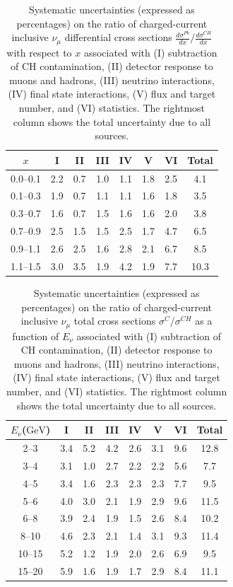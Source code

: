\documentclass[aps,preprint,showpacs,superscriptaddress]{revtex4} %
\newcommand{\numu}{\ensuremath{\nu_{\mu}}\xspace}
\newcommand{\GeV}{\ensuremath{\mbox{GeV}}\xspace}
\newcommand{\Xbj}{\ensuremath{x}\xspace}
\newcommand{\Enu}{\ensuremath{E_{\nu}}\xspace}
\begin{document}
\begingroup
\squeezetable
\begin{table}
  \begin{tabular}{cccccccc}
    \hline \hline
    \Xbj & I & II & III & IV & V & VI & Total \\ 
    \hline
    0.0--0.1 & 2.2 & 0.7 & 1.0 & 1.1 & 1.8 & 2.5 & 4.1 \\ 
    0.1--0.3 & 1.9 & 0.7 & 1.1 & 1.1 & 1.6 & 1.8 & 3.5 \\ 
    0.3--0.7 & 1.6 & 0.7 & 1.5 & 1.6 & 1.6 & 2.0 & 3.8 \\ 
    0.7--0.9 & 2.5 & 1.5 & 1.5 & 2.5 & 1.7 & 4.7 & 6.5 \\ 
    0.9--1.1 & 2.6 & 2.5 & 1.6 & 2.8 & 2.1 & 6.7 & 8.5 \\ 
    1.1--1.5 & 3.0 & 3.5 & 1.9 & 4.2 & 1.9 & 7.7 & 10.3 \\ 
    \hline \hline
  \end{tabular}
  \caption{Systematic uncertainties (expressed as percentages) on the ratio of charged-current inclusive \numu differential cross sections $\frac{d\sigma^{Pb}}{d\Xbj}/\frac{d\sigma^{CH}}{d\Xbj}$ with respect to \Xbj associated with  (I) subtraction of CH contamination, (II) detector response to muons and hadrons, (III) neutrino interactions, (IV) final state interactions, (V) flux and target number, and (VI) statistics.  The rightmost column shows the total uncertainty due to all sources.}
  \label{tab:x_ratio_82_93_sys_errors}
\end{table}
\endgroup

\begingroup
\squeezetable
\begin{table}
  \begin{tabular}{cccccccc}
    \hline \hline
    \Enu (\GeV) & I & II & III & IV & V & VI & Total \\ 
    \hline
    2--3 & 3.4 & 5.2 & 4.2 & 2.6 & 3.1 & 9.6 & 12.8 \\ 
    3--4 & 3.1 & 1.0 & 2.7 & 2.2 & 2.2 & 5.6 & 7.7 \\ 
    4--5 & 3.4 & 1.6 & 2.3 & 2.3 & 2.3 & 7.7 & 9.5 \\ 
    5--6 & 4.0 & 3.0 & 2.1 & 1.9 & 2.9 & 9.6 & 11.5 \\ 
    6--8 & 3.9 & 2.4 & 1.9 & 1.5 & 2.6 & 8.4 & 10.2 \\ 
    8--10 & 4.6 & 2.3 & 2.1 & 1.4 & 3.1 & 9.3 & 11.4 \\ 
    10--15 & 5.2 & 1.2 & 1.9 & 2.0 & 2.6 & 6.9 & 9.5 \\ 
    15--20 & 5.9 & 1.6 & 1.9 & 1.7 & 2.9 & 8.4 & 11.1 \\ 
    \hline \hline
  \end{tabular}
  \caption{Systematic uncertainties (expressed as percentages) on the ratio of charged-current inclusive \numu total cross sections $\sigma^{C}/\sigma^{CH}$ as a function of \Enu associated with  (I) subtraction of CH contamination, (II) detector response to muons and hadrons, (III) neutrino interactions, (IV) final state interactions, (V) flux and target number, and (VI) statistics.  The rightmost column shows the total uncertainty due to all sources.}
  \label{tab:Enu_ratio_06_91_sys_errors}
\end{table}
\endgroup
\end{document}
